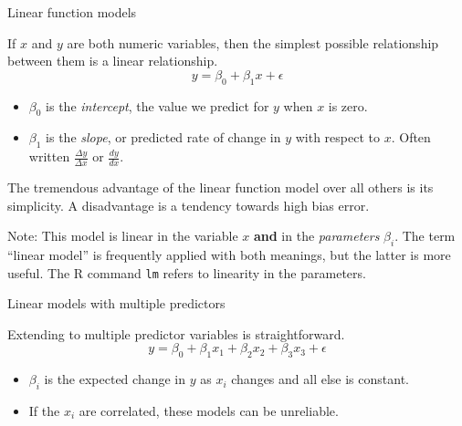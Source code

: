 \documentclass[
  ignorenonframetext,
]{beamer}
\providecommand{\tightlist}{%
  \setlength{\itemsep}{0pt}\setlength{\parskip}{0pt}}
\begin{document}
\begin{frame}[fragile]{Linear function models}
\protect\hypertarget{linear-function-models}{}

If \(x\) and \(y\) are both numeric variables, then the simplest
possible relationship between them is a linear relationship. \[
y = \beta_0 + \beta_1 x +\epsilon
\]

\begin{itemize}
\tightlist
\item
  \(\beta_0\) is the \emph{intercept}, the value we predict for \(y\)
  when \(x\) is zero.
\item
  \(\beta_1\) is the \emph{slope}, or predicted rate of change in \(y\)
  with respect to \(x\). Often written \(\frac{\Delta y}{\Delta x}\) or
  \(\frac{dy}{dx}\).
\end{itemize}

The tremendous advantage of the linear function model over all others is
its simplicity. A disadvantage is a tendency towards high bias error.

Note: This model is linear in the variable \(x\) \textbf{and} in the
\emph{parameters} \(\beta_i\). The term ``linear model'' is frequently
applied with both meanings, but the latter is more useful. The R command
\texttt{lm} refers to linearity in the parameters.

\end{frame}

\begin{frame}{Linear models with multiple predictors}
\protect\hypertarget{linear-models-with-multiple-predictors}{}

Extending to multiple predictor variables is straightforward. \[
y=\beta_0 + \beta_1 x_1 +\beta_2 x_2 +\beta_3 x_3 + \epsilon
\]

\begin{itemize}
\tightlist
\item
  \(\beta_i\) is the expected change in \(y\) as \(x_i\) changes and all
  else is constant.
\item
  If the \(x_i\) are correlated, these models can be unreliable.
\end{itemize}

\end{frame}
\end{document}
